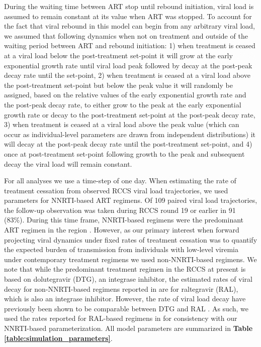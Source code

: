 \documentclass{article}[11pt]
\begin{document}
During the waiting time between ART stop until rebound initiation, viral load is assumed to remain constant at its value when ART was stopped. To account for the fact that viral rebound in this model can begin from any arbitrary viral load, we assumed that following dynamics when not on treatment and outside of the waiting period between ART and rebound initiation: 1) when treatment is ceased at a viral load below the post-treatment set-point it will grow at the early exponential growth rate until viral load peak followed by decay at the post-peak decay rate until the set-point, 2) when treatment is ceased at a viral load above the post-treatment set-point but below the peak value it will randomly be assigned, based on the relative values of the early exponential growth rate and the post-peak decay rate, to either grow to the peak at the early exponential growth rate or decay to the post-treatment set-point at the post-peak decay rate, 3) when treatment is ceased at a viral load above the peak value (which can occur as individual-level parameters are drawn from independent distributions) it will decay at the post-peak decay rate until the post-treatment set-point, and 4) once at post-treatment set-point following growth to the peak and subsequent decay the viral load will remain constant. 

For all analyses we use a time-step of one day. When estimating the rate of treatment cessation from observed RCCS viral load trajectories, we used parameters for NNRTI-based ART regimens. Of 109 paired viral load trajectories, the follow-up observation was taken during RCCS round 19 or earlier in 91 (83\%). During this time frame, NNRTI-based regimens were the predominant ART regimen in the region \cite{martin2026}. However, as our primary interest when forward projecting viral dynamics under fixed rates of treatment cessation was to quantify the expected burden of transmission from individuals with low-level viremia under contemporary treatment regimens we used non-NNRTI-based regimens. We note that while the predominant treatment regimen in the RCCS at present is based on dolutegravir (DTG), an integrase inhibitor, the estimated rates of viral decay for non-NNRTI-based regimens reported in \cite{andrade2013} are for raltegravir (RAL), which is also an integrase inhibitor. However, the rate of viral load decay have previously been shown to be comparable between DTG and RAL . As such, we used the rates reported for RAL-based regimens in \cite{andrade2013} for consistency with our NNRTI-based parameterization. All model parameters are summarized in \textbf{Table \ref{table:simulation_parameters}}.
\end{document}
